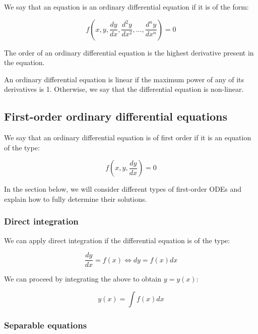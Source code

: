 \documentclass[12pt]{article}
\begin{document}
\begin{definition}
    We say that an equation is an ordinary differential equation if it is of the form:

    \[ f(x, y, \frac{dy}{dx}, \frac{d^2y}{dx^2}, \dots, \frac{d^ny}{dx^n}) = 0 \]
\end{definition}

\begin{definition}[Order]
    The order of an ordinary differential equation is the highest derivative present in the equation.
\end{definition}

\begin{definition}[Linearity]
    An ordinary differential equation is linear if the maximum power of any of its derivatives is 1. Otherwise, we say that the differential equation is non-linear.
\end{definition}

\subsection{First-order ordinary differential equations}

\begin{definition}
    We say that an ordinary differential equation is of first order if it is an equation of the type:

    \[ f(x, y, \frac{dy}{dx}) = 0 \]
\end{definition}

In the section below, we will consider different types of first-order ODEs and explain how to fully determine their solutions.

\subsubsection{Direct integration}

We can apply direct integration if the differential equation is of the type:

\[ \frac{dy}{dx} = f(x) \Leftrightarrow dy = f(x)dx \]

We can proceed by integrating the above to obtain $y = y(x):$

\[ y(x) = \int f(x)dx \]

\subsubsection{Separable equations}
\end{document}
